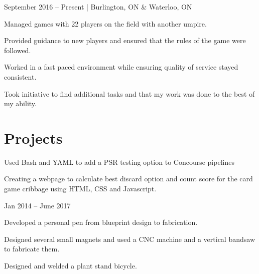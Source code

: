 \documentclass[]{formatting}
\begin{document}
 {September 2016 – Present | Burlington, ON  \& Waterloo, ON}
\begin{tightemize}
\item Managed games with 22 players on the field with another umpire. 
\item Provided guidance to new players and ensured that the rules of the game were followed. 
\end{tightemize}
\sectionsep

\begin{tightemize}
\item Worked in a fast paced environment while ensuring quality of service stayed consistent.  
\item Took initiative to find additional tasks and that my work was done to the best of my ability. 
\end{tightemize}
\sectionsep


\section{Projects}

\begin{tightemize}
\item Used Bash and YAML to add a PSR testing option to Concourse pipelines
\end{tightemize}
\sectionsep

\begin{tightemize}
\item Creating a webpage to calculate best discard option and count score for the card game cribbage using HTML, CSS and Javascript. 
\end{tightemize}
\sectionsep

 {Jan 2014 – June 2017}
\begin{tightemize}
\item Developed a personal pen from blueprint design to fabrication.
\item Designed several small magnets and used a CNC machine and a vertical bandsaw to fabricate them. 
\item Designed and welded a plant stand bicycle. 
\end{tightemize}
\sectionsep
\end{document}
